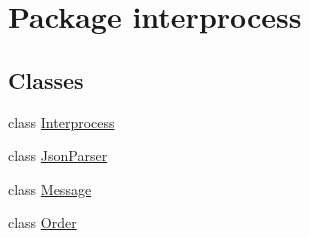 \hypertarget{namespaceinterprocess}{}\section{Package interprocess}
\label{namespaceinterprocess}
\subsection*{Classes}
\begin{DoxyCompactItemize}
\item 
class \hyperlink{classinterprocess_1_1_interprocess}{Interprocess}
\item 
class \hyperlink{classinterprocess_1_1_json_parser}{Json\+Parser}
\item 
class \hyperlink{classinterprocess_1_1_message}{Message}
\item 
class \hyperlink{classinterprocess_1_1_order}{Order}
\end{DoxyCompactItemize}
